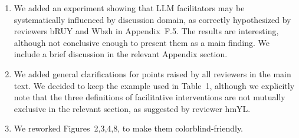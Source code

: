 \documentclass[11pt,a4paper]{article}
\begin{document}
\begin{enumerate}
		\item We added an experiment showing that LLM facilitators may be systematically influenced by discussion domain, as correctly hypothesized by reviewers bRUY and Wbzh in Appendix~F.5. The results are interesting, although not conclusive enough to present them as a main finding. We include a brief discussion in the relevant Appendix section.
		
		\item We added general clarifications for points raised by all reviewers in the main text. We decided to keep the example used in Table~1, although we explicitly note that the three definitions of facilitative interventions are not mutually exclusive in the relevant section, as suggested by reviewer hmYL.
		
		\item We reworked Figures~2,3,4,8, to make them colorblind-friendly.
	\end{enumerate}
\end{document}
